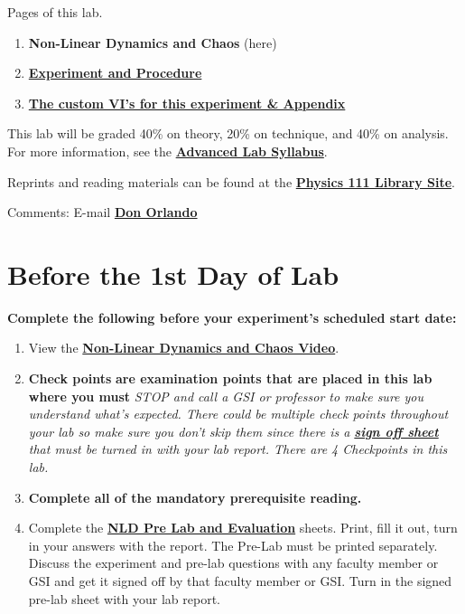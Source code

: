 \documentclass{../lab}
\begin{document}
Pages of this lab.

\begin{enumerate}
    \item \textbf{Non-Linear Dynamics and Chaos} (here)

    \item \href{http://experimentationlab.berkeley.edu/node/102}{\textbf{Experiment and Procedure}}
    
    \item \href{http://experimentationlab.berkeley.edu/node/103}{\textbf{The custom VI's for this experiment \& Appendix}}
\end{enumerate}

This lab will be graded 40\% on theory, 20\% on technique, and 40\% on analysis. For more information, see the \href{\AdvancedLabSyllabus}{\textbf{Advanced Lab Syllabus}}.

Reprints and reading materials can be found at the \href{http://physics111.lib.berkeley.edu/Physics111/Reprints/NLD/NLD\_index.html}{\textbf{Physics 111 Library Site}}.

Comments: E-mail \href{\MailDonOrlando}{\textbf{Don Orlando}}

\section{Before the 1st Day of Lab}

\textbf{Complete the following before your experiment's scheduled start date:}

\begin{enumerate}
    \item View the \href{http://www.youtube.com/watch?v=Y0u3o9\_BRVQ}{\textbf{Non-Linear Dynamics and Chaos Video}}.

    \item \textbf{Check points} \textbf{are examination points that are placed in this lab where you must }\emph{STOP and call a GSI or professor to make sure you understand what's expected. There could  be multiple check points throughout your lab so make sure you don't skip them since there is a \href{http://experimentationlab.berkeley.edu/nldcheckpoints}{\textbf{sign off sheet}} that must be turned in with your lab report. There are 4 Checkpoints in this lab.}

    \item \textbf{Complete all of the mandatory prerequisite reading.}

    \item Complete the \href{http://experimentationlab.berkeley.edu/NLDPreLab}{\textbf{NLD Pre Lab and Evaluation}} sheets. Print, fill it out, turn in your answers with the report. The Pre-Lab must be printed separately. Discuss the experiment and pre-lab questions with any faculty member or GSI and get it signed off by that faculty member or GSI. Turn in the signed pre-lab sheet with your lab report.

\end{enumerate}
\end{document}
